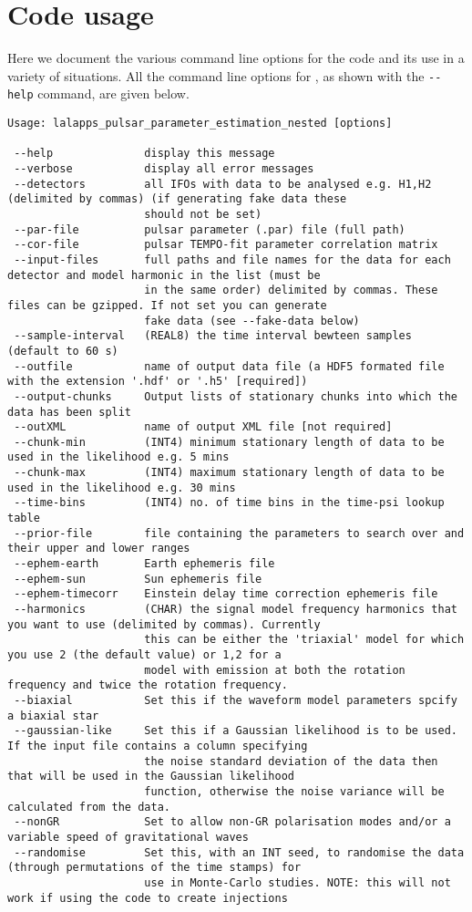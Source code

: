 \appendix

\section{Code usage}

Here we document the various command line options for the code and its use in a variety of situations. All the command
line options for \lppen, as shown with the \verb|--help| command, are given below.
\begin{lstlisting}[frame=single]
Usage: lalapps_pulsar_parameter_estimation_nested [options]

 --help              display this message
 --verbose           display all error messages
 --detectors         all IFOs with data to be analysed e.g. H1,H2 (delimited by commas) (if generating fake data these
                     should not be set)
 --par-file          pulsar parameter (.par) file (full path)
 --cor-file          pulsar TEMPO-fit parameter correlation matrix
 --input-files       full paths and file names for the data for each detector and model harmonic in the list (must be
                     in the same order) delimited by commas. These files can be gzipped. If not set you can generate
                     fake data (see --fake-data below)
 --sample-interval   (REAL8) the time interval bewteen samples (default to 60 s)
 --outfile           name of output data file (a HDF5 formated file with the extension '.hdf' or '.h5' [required])
 --output-chunks     Output lists of stationary chunks into which the data has been split
 --outXML            name of output XML file [not required]
 --chunk-min         (INT4) minimum stationary length of data to be used in the likelihood e.g. 5 mins
 --chunk-max         (INT4) maximum stationary length of data to be used in the likelihood e.g. 30 mins
 --time-bins         (INT4) no. of time bins in the time-psi lookup table
 --prior-file        file containing the parameters to search over and their upper and lower ranges
 --ephem-earth       Earth ephemeris file
 --ephem-sun         Sun ephemeris file
 --ephem-timecorr    Einstein delay time correction ephemeris file
 --harmonics         (CHAR) the signal model frequency harmonics that you want to use (delimited by commas). Currently
                     this can be either the 'triaxial' model for which you use 2 (the default value) or 1,2 for a
                     model with emission at both the rotation frequency and twice the rotation frequency.
 --biaxial           Set this if the waveform model parameters spcify a biaxial star
 --gaussian-like     Set this if a Gaussian likelihood is to be used. If the input file contains a column specifying
                     the noise standard deviation of the data then that will be used in the Gaussian likelihood
                     function, otherwise the noise variance will be calculated from the data.
 --nonGR             Set to allow non-GR polarisation modes and/or a variable speed of gravitational waves
 --randomise         Set this, with an INT seed, to randomise the data (through permutations of the time stamps) for
                     use in Monte-Carlo studies. NOTE: this will not work if using the code to create injections


\end{lstlisting}
